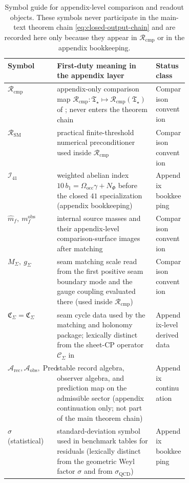\documentclass[11pt,a4paper]{article}
\theoremstyle{definition}
\theoremstyle{remark}
\newcommand{\bone}{b_1}
\newcommand{\SM}{\mathrm{SM}}
\newcommand{\Arec}{\mathcal A_{\mathrm{rec}}}
\newcommand{\Aobs}{\mathcal A_{\mathrm{obs}}}
\newcommand{\Pred}{\operatorname{Pred}}
\newcommand{\Tstar}{\mathfrak T_{\star}}
\newcommand{\sigmaQCD}{\sigma_{\mathrm{QCD}}}
\newcommand{\Cseam}{\mathcal C_{\Sigma}}
\newcommand{\Ccyc}{\mathfrak C_{\Sigma}}
\newcommand{\Rcmp}{\mathcal R_{\mathrm{cmp}}}
\begin{document}
\begin{table}[p]
\centering
\scriptsize
\setlength{\tabcolsep}{3pt}
\renewcommand{\arraystretch}{0.95}
\begin{tabularx}{\linewidth}{@{}>{\raggedright\arraybackslash}p{0.23\linewidth}Y>{\raggedright\arraybackslash}p{0.18\linewidth}@{}}
\toprule
Symbol & First-duty meaning in the appendix layer & Status class \\
\midrule
$\Rcmp$ & appendix-only comparison map $\Rcmp:\Tstar\mapsto\Rcmp(\Tstar)$ of ; never enters the theorem chain & Comparison convention \\
$\mathcal R_{\SM}$ & practical finite-threshold numerical preconditioner used inside $\Rcmp$ & Comparison convention \\
$\mathcal I_{41}$ & weighted abelian index $10\,\bone=\Omega_{\mathrm{occ}}\gamma+N_\Phi$ before the closed $41$ specialization (appendix bookkeeping) & Appendix bookkeeping \\
$\hat m_f,\ m_f^{\mathrm{obs}}$ & internal source masses and their appendix-level comparison-surface images after matching & Comparison convention \\
$M_\Sigma,\ g_\Sigma$ & seam matching scale read from the first positive seam boundary mode and the gauge coupling evaluated there (used inside $\Rcmp$) & Comparison convention \\
$\Ccyc=\mathfrak C_\Sigma$ & seam cycle data used by the matching and holonomy package; lexically distinct from the sheet-CP operator $\Cseam$ in  & Appendix-level derived data \\
$\Arec,\Aobs,\Pred$ & stable record algebra, observer algebra, and prediction map on the admissible sector (appendix continuation only; not part of the main theorem chain) & Appendix continuation \\
$\sigma$ (statistical) & standard-deviation symbol used in benchmark tables for residuals (lexically distinct from the geometric Weyl factor $\sigma$ and from $\sigmaQCD$) & Appendix bookkeeping \\
\bottomrule
\end{tabularx}
\caption{Symbol guide for appendix-level comparison and readout objects. These symbols never
participate in the main-text theorem chain \eqref{eq:closed-output-chain} and are
recorded here only because they appear in $\Rcmp$ or in the appendix bookkeeping.}
\label{tab:symbol-guide-appendix}
\end{table}
\end{document}
